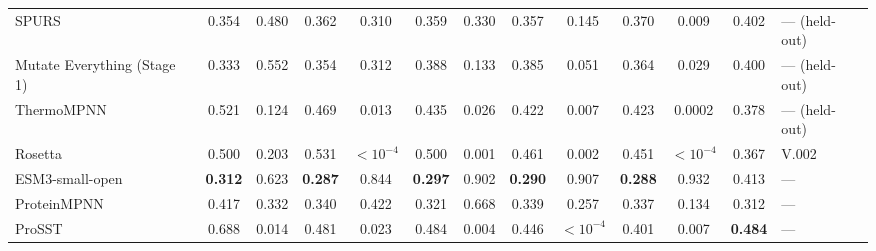\begin{table}[H]
{\begin{tabular}{lcccccccccccl}
SPURS & 0.354 & 0.480 & 0.362 & 0.310 & 0.359 & 0.330 & 0.357 & 0.145 & 0.370 & 0.009 & 0.402 & --- (held-out) \\
Mutate Everything (Stage 1) & 0.333 & 0.552 & 0.354 & 0.312 & 0.388 & 0.133 & 0.385 & 0.051 & 0.364 & 0.029 & 0.400 & --- (held-out) \\
ThermoMPNN & 0.521 & 0.124 & 0.469 & 0.013 & 0.435 & 0.026 & 0.422 & 0.007 & 0.423 & 0.0002 & 0.378 & --- (held-out) \\
Rosetta & 0.500 & 0.203 & 0.531 & $<10^{-4}$ & 0.500 & 0.001 & 0.461 & 0.002 & 0.451 & $<10^{-4}$ & 0.367 & V.002 \\
ESM3-small-open & \textbf{0.312} & 0.623 & \textbf{0.287} & 0.844 & \textbf{0.297} & 0.902 & \textbf{0.290} & 0.907 & \textbf{0.288} & 0.932 & 0.413 & --- \\
ProteinMPNN & 0.417 & 0.332 & 0.340 & 0.422 & 0.321 & 0.668 & 0.339 & 0.257 & 0.337 & 0.134 & 0.312 & --- \\
ProSST & 0.688 & 0.014 & 0.481 & 0.023 & 0.484 & 0.004 & 0.446 & $<10^{-4}$ & 0.401 & 0.007 & \textbf{0.484} & --- \\
\bottomrule
\end{tabular}
}
\end{table}




